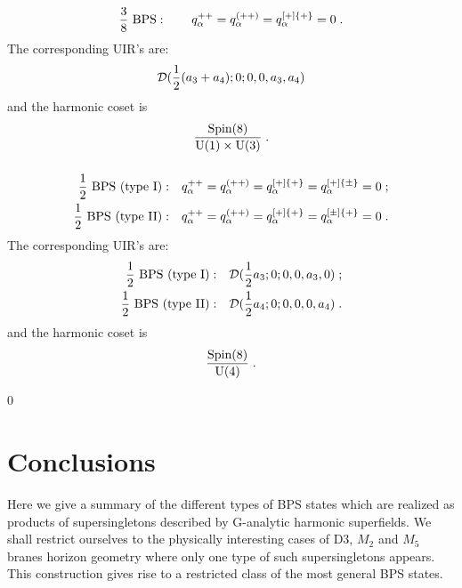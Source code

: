 \documentclass[a4paper,12pt]{article}
\begin{document}
\begin{equation}\label{8.20}
  {3\over 8}\ \mbox{BPS}:\qquad  q_\alpha^{++} =q_\alpha^{(++)} = 
q_\alpha^{[+]\{+\}} =0\;.  
\end{equation}
The corresponding UIR's are: 
\begin{equation}\label{8.21}
  {\cal D}({1\over 2}(a_3+a_4);0;0,0,a_3,a_4)
\end{equation}
and the harmonic coset is 
\begin{equation}\label{8.22}
  {\mbox{Spin}(8)\over \mbox{U}(1)\times \mbox{U}(3)}\;.
\end{equation}

\subsubsection{} \label{7.4.4}

\begin{eqnarray}
  {1\over 2}\ \mbox{BPS (type I)}:&& q_\alpha^{++} =q_\alpha^{(++)} = 
q_\alpha^{[+]\{+\}}=q_\alpha^{[+]\{\pm\}} =0\;; \label{8.23}\\ 
  {1\over 2}\ \mbox{BPS (type II)}:&& q_\alpha^{++} =q_\alpha^{(++)} = 
q_\alpha^{[+]\{+\}}=q_\alpha^{[\pm]\{+\}} =0\;. \label{8.23'} 
\end{eqnarray}
The corresponding UIR's are: 
\begin{eqnarray}
  {1\over 2}\ \mbox{BPS (type I)}:&& {\cal D}({1\over 2}a_3;0;0,0,a_3,0)\;; \label{8.24}\\ 
  {1\over 2}\ \mbox{BPS (type II)}:&& {\cal D}({1\over 2}a_4;0;0,0,0,a_4)\;. \label{8.24'} 
\end{eqnarray} 
and the harmonic coset is 
\begin{equation}\label{8.25}
  {\mbox{Spin}(8)\over \mbox{U}(4)}\;.
\end{equation}

 


\setcounter{equation}0 
\section{Conclusions}


Here we give a summary of the different types of BPS states which 
are realized as products of supersingletons described by 
G-analytic harmonic superfields. We shall restrict ourselves to 
the physically interesting cases of D3, $M_2$ and $M_5$ branes 
horizon geometry where only one type of such supersingletons 
appears. This construction gives rise to a restricted class of the 
most general BPS states. 
\end{document}
